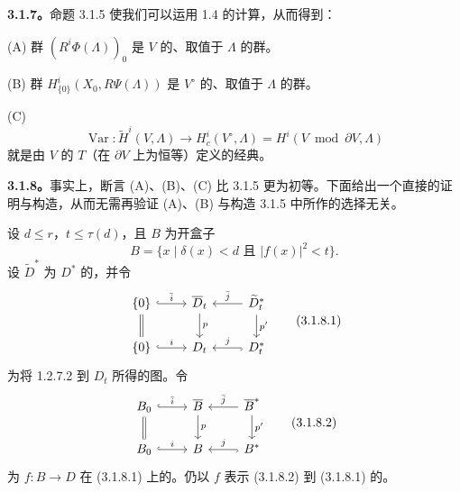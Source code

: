 \textbf{3.1.7。}命题 3.1.5 使我们可以运用 1.4 的计算，从而得到：

(A) 群 $(R^i\Phi(\Lambda))_0$ 是 $V$ 的、取值于 $\Lambda$ 的群。

(B) 群 $H_{\{0\}}^i(X_0,R\Psi(\Lambda))$ 是 $V^\circ$ 的、取值于 $\Lambda$ 的群。

(C) 
\[
 \operatorname{Var}:\widetilde H^i(V,\Lambda)\longrightarrow H_c^i(V^\circ,\Lambda)
 =H^i(V\bmod\partial V,\Lambda)
\]
就是由 $V$ 的 $T$（在 $\partial V$ 上为恒等）定义的经典。

\textbf{3.1.8。}事实上，断言 (A)、(B)、(C) 比 3.1.5 更为初等。下面给出一个直接的证明与构造，从而无需再验证 (A)、(B) 与构造 3.1.5 中所作的选择无关。

设 $d\leq r$，$t\leq\tau(d)$，且 $B$ 为开盒子
\[
 B=\{x\mid\delta(x)<d\text{ 且 }|f(x)|^2<t\}.
\]
设 $\widetilde D^*$ 为 $D^*$ 的，并令
\[
\begin{tikzcd}
\{0\}\arrow[r,hook,"\bar i"]\arrow[d,equal]&\overline D_t\arrow[d,"p"]&\widetilde D_t^*\arrow[l,"\bar j"']\arrow[d,"p'"]\\
\{0\}\arrow[r,hook,"i"]&D_t&D_t^*\arrow[l,hook,"j"']
\end{tikzcd}\tag{3.1.8.1}
\]
为将 1.2.7.2 到 $D_t$ 所得的图。令
\[
\begin{tikzcd}
 B_0\arrow[r,hook,"\bar i"]\arrow[d,equal]&\overline B\arrow[d,"p"]&\overline B^*\arrow[l,"\bar j"']\arrow[d,"p'"]\\
 B_0\arrow[r,hook,"i"]&B&B^*\arrow[l,hook,"j"']
\end{tikzcd}\tag{3.1.8.2}
\]
为 $f:B\to D$ 在 (3.1.8.1) 上的。仍以 $f$ 表示 (3.1.8.2) 到 (3.1.8.1) 的。


